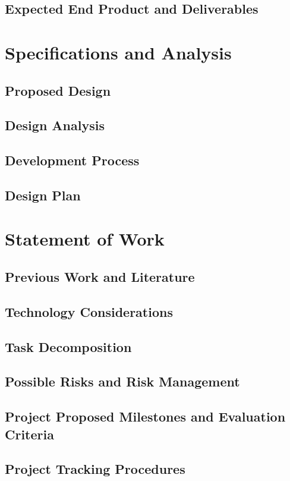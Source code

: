 \documentclass[11pt]{article}
\begin{document}
\subsection{Expected End Product and Deliverables}




\section{Specifications and Analysis}
\subsection{Proposed Design}
\subsection{Design Analysis}
\subsection{Development Process}
\subsection{Design Plan}




\section{Statement of Work}
\subsection{Previous Work and Literature}
\subsection{Technology Considerations}
\subsection{Task Decomposition}
\subsection{Possible Risks and Risk Management}
\subsection{Project Proposed Milestones and Evaluation Criteria}
\subsection{Project Tracking Procedures}
\end{document}
